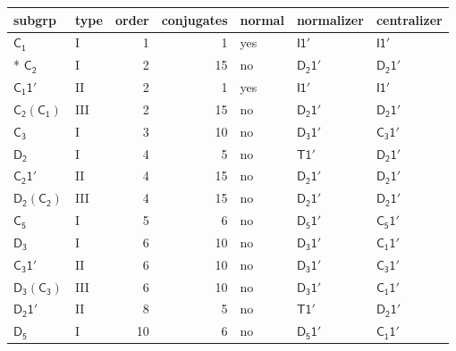 \documentclass[10pt,a4paper]{article}
\numberwithin{equation}{section}
\newcommand{\grp}[1]{\mathsf{#1}}
\begin{document}
{\small\begin{longtable}{@{}llrrlll@{}}\toprule
subgrp & type & order & conjugates & normal & normalizer & centralizer\\\midrule\endhead
\bottomrule\endfoot\endlastfoot
\href{../../../rotation/data/pdf/C1.pdf}{$\grp{C_{1}}$} & I & 1 & 1 & yes & \href{I-1p.pdf}{$\grp{I1'}$} & \href{I-1p.pdf}{$\grp{I1'}$}\\*
\href{../../../rotation/data/pdf/C2.pdf}{$\grp{C_{2}}$} & I & 2 & 15 & no & \href{D2-1p.pdf}{$\grp{D_{2}1'}$} & \href{D2-1p.pdf}{$\grp{D_{2}1'}$}\\
\href{C1-1p.pdf}{$\grp{C_{1}1'}$} & II & 2 & 1 & yes & \href{I-1p.pdf}{$\grp{I1'}$} & \href{I-1p.pdf}{$\grp{I1'}$}\\
\href{C2-C1.pdf}{$\grp{C_{2}}(\grp{C_{1}})$} & III & 2 & 15 & no & \href{D2-1p.pdf}{$\grp{D_{2}1'}$} & \href{D2-1p.pdf}{$\grp{D_{2}1'}$}\\
\href{../../../rotation/data/pdf/C3.pdf}{$\grp{C_{3}}$} & I & 3 & 10 & no & \href{D3-1p.pdf}{$\grp{D_{3}1'}$} & \href{C3-1p.pdf}{$\grp{C_{3}1'}$}\\
\href{../../../rotation/data/pdf/D2.pdf}{$\grp{D_{2}}$} & I & 4 & 5 & no & \href{T-1p.pdf}{$\grp{T1'}$} & \href{D2-1p.pdf}{$\grp{D_{2}1'}$}\\
\href{C2-1p.pdf}{$\grp{C_{2}1'}$} & II & 4 & 15 & no & \href{D2-1p.pdf}{$\grp{D_{2}1'}$} & \href{D2-1p.pdf}{$\grp{D_{2}1'}$}\\
\href{D2-C2.pdf}{$\grp{D_{2}}(\grp{C_{2}})$} & III & 4 & 15 & no & \href{D2-1p.pdf}{$\grp{D_{2}1'}$} & \href{D2-1p.pdf}{$\grp{D_{2}1'}$}\\
\href{../../../rotation/data/pdf/C5.pdf}{$\grp{C_{5}}$} & I & 5 & 6 & no & \href{D5-1p.pdf}{$\grp{D_{5}1'}$} & \href{C5-1p.pdf}{$\grp{C_{5}1'}$}\\
\href{../../../rotation/data/pdf/D3.pdf}{$\grp{D_{3}}$} & I & 6 & 10 & no & \href{D3-1p.pdf}{$\grp{D_{3}1'}$} & \href{C1-1p.pdf}{$\grp{C_{1}1'}$}\\
\href{C3-1p.pdf}{$\grp{C_{3}1'}$} & II & 6 & 10 & no & \href{D3-1p.pdf}{$\grp{D_{3}1'}$} & \href{C3-1p.pdf}{$\grp{C_{3}1'}$}\\
\href{D3-C3.pdf}{$\grp{D_{3}}(\grp{C_{3}})$} & III & 6 & 10 & no & \href{D3-1p.pdf}{$\grp{D_{3}1'}$} & \href{C1-1p.pdf}{$\grp{C_{1}1'}$}\\
\href{D2-1p.pdf}{$\grp{D_{2}1'}$} & II & 8 & 5 & no & \href{T-1p.pdf}{$\grp{T1'}$} & \href{D2-1p.pdf}{$\grp{D_{2}1'}$}\\
\href{../../../rotation/data/pdf/D5.pdf}{$\grp{D_{5}}$} & I & 10 & 6 & no & \href{D5-1p.pdf}{$\grp{D_{5}1'}$} & \href{C1-1p.pdf}{$\grp{C_{1}1'}$}\\

\end{longtable}}
\end{document}
